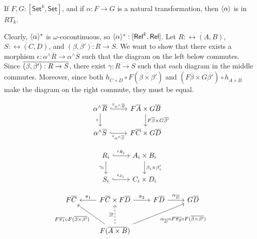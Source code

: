 \documentclass{lmcs}
\theoremstyle{plain}\newtheorem{satz}[thm]{Satz}
\newcommand{\set}{\mathsf{Set}}
\begin{document}
\begin{lem}\label{lem:graph-reln-functors}
If $F,G : [\set^k,\set]$, and if $\alpha : F \to G$ is a natural
transformation, then $\langle {\alpha} \rangle$ is in $RT_k$.
\end{lem}
\proof
Clearly, $\langle {\alpha} \rangle^*$ is $\omega$-cocontinuous, so
$\langle {\alpha} \rangle^* : [\mathsf{Rel}^k,\mathsf{Rel}]$. Let $\overline{R :
  \rel(A, B)}$, $\overline{S : \rel(C, D)}$, and $\overline{(\beta,
  \beta') : R \to S}$. We want to show that there exists a morphism
$\epsilon : \alpha^\wedge\overline{R} \to \alpha^\wedge\overline{S}$
such that the diagram on the left below commutes. Since
$\overline{(\beta,\beta') : R \to S}$, there exist $\overline{\gamma : R \to
  S}$ such that each diagram in the middle commutes.
Moreover, since both $h_{\overline{C \times D}} \circ
F(\overline{\beta \times \beta'})$ and $(F\overline{\beta} \times
G\overline{\beta'}) \circ h_{\overline{A \times B}}$ make the diagram
on the right commute, they must be equal.
  \begin{minipage}[b]{0.25\linewidth}
 {\small    \[
    \begin{tikzcd}
        \alpha^\wedge\overline{R}
        \ar[r, hookrightarrow, "{\iota_{\alpha^\wedge\overline{R}}}"]
        \ar[d, "{\epsilon}"']
        & F\overline{A} \times G\overline{B}
        \ar[d, "{F\overline{\beta} \times G\overline{\beta'}}"] \\
        \alpha^\wedge\overline{S}
        \ar[r, hookrightarrow, "{\iota_{\alpha^\wedge\overline{S}}}"']
        & F\overline{C} \times G\overline{D}
    \end{tikzcd}
    \]}
\end{minipage}
\begin{minipage}[b]{0.25\linewidth}
{\small    \[
    \begin{tikzcd}
        R_i
        \ar[d, "{\gamma_i}"']
        \ar[r, hookrightarrow, "{\iota_{R_i}}"]
        &A_i \times B_i
        \ar[d, "{\beta_i \times \beta'_i}"] \\
        S_i
        \ar[r, hookrightarrow, "{\iota_{S_i}}"]
        &C_i \times D_i
    \end{tikzcd}
    \]}
\end{minipage}
\begin{minipage}[b]{0.25\linewidth}
{\footnotesize \[
      \begin{tikzcd}[row sep = large]
          F\overline{C}
          &F\overline{C} \times F\overline{D}
          \ar[l, "{\pi_1}"'] \ar[r, "{\pi_2}"]
          &F\overline{D}
          \ar[r, "{\alpha_{\ol{D}}}"]
          &G\overline{D}\\
          &F(\overline{A \times B})
          \ar[u, dashed, "{\exists !}"]
          \ar[ul, "{F\ol{\pi_1} \circ F(\overline{\beta \times \beta'})}"]
          \ar[urr, "{\alpha_{\ol{D}} \circ F\ol{\pi_2} \circ F(\overline{\beta \times \beta'})}"']
      \end{tikzcd}
      \]}
\end{minipage}
\end{document}
